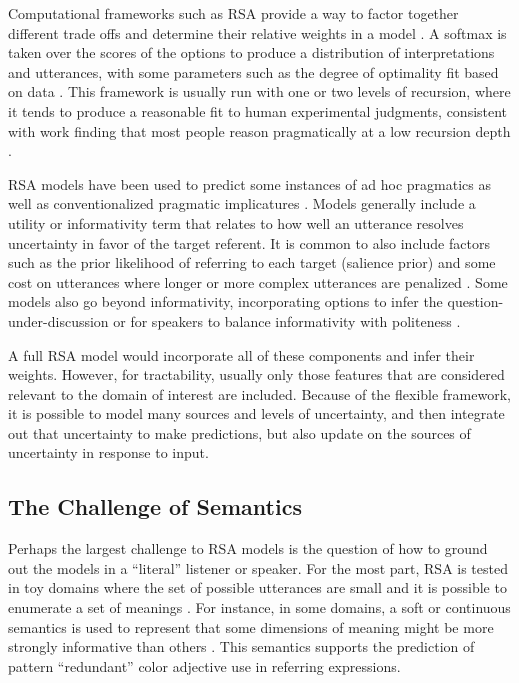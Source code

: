 \documentclass[]{article}
\begin{document}
Computational frameworks such as RSA provide a way to factor together different trade offs and determine their relative weights in a model \citep{TODO}. A softmax is taken over the scores of the options to produce a distribution of interpretations and utterances, with some parameters such as the degree of optimality fit based on data \citep{TODO}.  
This framework is usually run with one or two levels of recursion, where it tends to produce a reasonable fit to human experimental judgments, consistent with work finding that most people reason pragmatically at a low recursion depth \citep{franke2016}. 

RSA models have been used to predict some instances of ad hoc pragmatics as well as conventionalized pragmatic implicatures \citep{TODO}. Models generally include a utility or informativity term that relates to how well an utterance resolves uncertainty in favor of the target referent.  It is common to also include factors such as the prior likelihood of referring to each target (salience prior) and some cost on utterances where longer or more complex utterances are penalized \citep{goodman2016}. Some models also go beyond informativity, incorporating options to infer the question-under-discussion \citep{TODO} or for speakers to balance informativity with politeness \citep{TODO}.

A full RSA model would incorporate all of these components and infer their weights. However, for tractability, usually only those features that are considered relevant to the domain of interest are included. Because of the flexible framework, it is possible to model many sources and levels of uncertainty, and then integrate out that uncertainty to make predictions, but also update on the sources of uncertainty in response to input. 

\subsection{The Challenge of Semantics}
Perhaps the largest challenge to RSA models is the question of how to ground out the models in a ``literal'' listener or speaker. For the most part, RSA is tested in toy domains where the set of possible utterances are small and it is possible to enumerate a set of meanings \citep{TODO}. For instance, in some domains, a soft or continuous semantics is used to represent that some dimensions of meaning might be more strongly informative than others \cite{degen20200406}. This semantics supports the prediction of pattern ``redundant'' color adjective use in referring expressions. 
\end{document}
